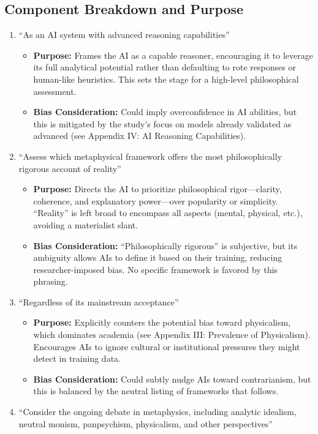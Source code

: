 \documentclass[11pt]{article}
\begin{document}
\subsection{Component Breakdown and Purpose}
\begin{enumerate}
  \item ``As an AI system with advanced reasoning capabilities''
    \begin{itemize}
      \item \textbf{Purpose:} Frames the AI as a capable reasoner, encouraging it to leverage its full analytical potential rather than defaulting to rote responses or human-like heuristics. This sets the stage for a high-level philosophical assessment.
      \item \textbf{Bias Consideration:} Could imply overconfidence in AI abilities, but this is mitigated by the study’s focus on models already validated as advanced (see Appendix IV: AI Reasoning Capabilities).
    \end{itemize}
  \item ``Assess which metaphysical framework offers the most philosophically rigorous account of reality''
    \begin{itemize}
      \item \textbf{Purpose:} Directs the AI to prioritize philosophical rigor---clarity, coherence, and explanatory power---over popularity or simplicity. ``Reality'' is left broad to encompass all aspects (mental, physical, etc.), avoiding a materialist slant.
      \item \textbf{Bias Consideration:} ``Philosophically rigorous'' is subjective, but its ambiguity allows AIs to define it based on their training, reducing researcher-imposed bias. No specific framework is favored by this phrasing.
    \end{itemize}
  \item ``Regardless of its mainstream acceptance''
    \begin{itemize}
      \item \textbf{Purpose:} Explicitly counters the potential bias toward physicalism, which dominates academia (see Appendix III: Prevalence of Physicalism). Encourages AIs to ignore cultural or institutional pressures they might detect in training data.
      \item \textbf{Bias Consideration:} Could subtly nudge AIs toward contrarianism, but this is balanced by the neutral listing of frameworks that follows.
    \end{itemize}
  \item ``Consider the ongoing debate in metaphysics, including analytic idealism, neutral monism, panpsychism, physicalism, and other perspectives''

\end{enumerate}
\end{document}
